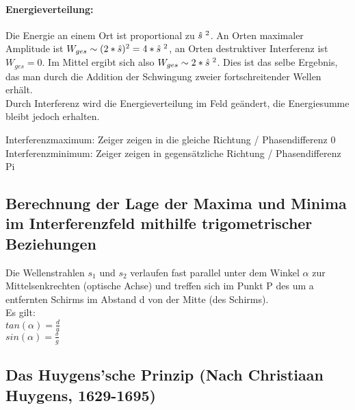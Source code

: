 			\paragraph{Energieverteilung: } Die Energie an einem Ort ist proportional zu $\hat{s}^{\hspace{1mm} 2}$. An Orten maximaler Amplitude ist $ W_{ges} \sim (2 \ast \hat{s})^{2} = 4 \ast \hat{s}^{\hspace{1mm} 2}$, an Orten destruktiver Interferenz ist $W_{ges} = 0 $. Im Mittel ergibt sich also $ W_{ges} \sim 2 \ast \hat{s}^{\hspace{1mm} 2}$. Dies ist das selbe Ergebnis, das man durch die Addition der Schwingung zweier fortschreitender Wellen erhält. 
			\vspace{2mm} \\
			Durch Interferenz wird die Energieverteilung im Feld geändert, die Energiesumme bleibt jedoch erhalten. 
			
			
			\newpage\noindent
			Interferenzmaximum: Zeiger zeigen in die gleiche Richtung / Phasendifferenz 0 \\
			Interferenzminimum: Zeiger zeigen in gegensätzliche Richtung / Phasendifferenz Pi
			\vspace{10mm}\\
			
		\subsection{Berechnung der Lage der Maxima und Minima im Interferenzfeld mithilfe trigometrischer Beziehungen}
		
		Die Wellenstrahlen $s_1$ und $s_2$ verlaufen fast parallel unter dem Winkel $\alpha$ zur Mittelsenkrechten (optische Achse) und treffen sich im Punkt P des um a entfernten Schirms im Abstand d von der Mitte (des Schirms). 
		\vspace{5mm} \\
		Es gilt: 
		\vspace{2mm} \\
		$ tan (\alpha) = \frac{d}{a} $
		\vspace{2mm} \\
		$ sin (\alpha) = \frac{\delta}{g} $
		
		\subsection{Das Huygens'sche Prinzip (Nach Christiaan Huygens, 1629-1695)}
		
